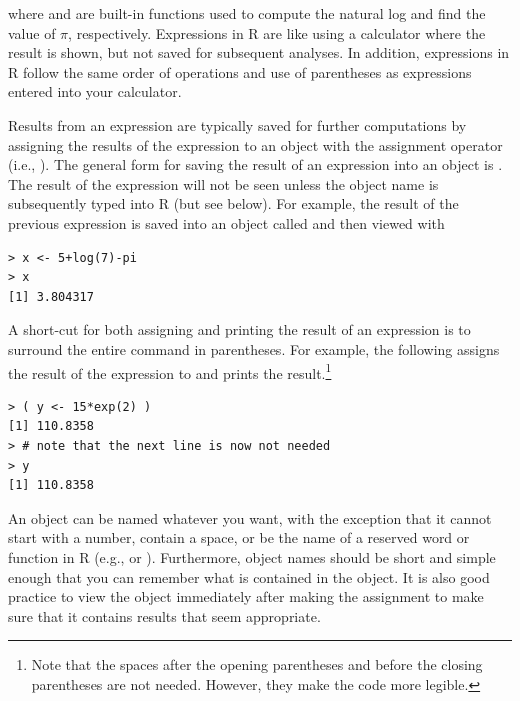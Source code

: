 \documentclass[10pt,openany]{book}\usepackage[]{graphicx}\usepackage[]{color}
\makeatletter
\newenvironment{kframe}{%
 \def\at@end@of@kframe{}%
 \ifinner\ifhmode%
  \def\at@end@of@kframe{\end{minipage}}%
  \begin{minipage}{\columnwidth}%
 \fi\fi%
 \def\FrameCommand##1{\hskip\@totalleftmargin \hskip-\fboxsep
 \colorbox{shadecolor}{##1}\hskip-\fboxsep
     \hskip-\linewidth \hskip-\@totalleftmargin \hskip\columnwidth}%
 \MakeFramed {\advance\hsize-\width
   \@totalleftmargin\z@ \linewidth\hsize
   \@setminipage}}%
 {\par\unskip\endMakeFramed%
 \at@end@of@kframe}
\newenvironment{knitrout}{}{} %
\makeatother
\begin{document}
where  and  are built-in functions used to compute the natural log and find the value of $\pi$, respectively.  Expressions in R are like using a calculator where the result is shown, but not saved for subsequent analyses.  In addition, expressions in R follow the same order of operations and use of parentheses as expressions entered into your calculator.


Results from an expression are typically saved for further computations by assigning the results of the expression to an object with the assignment operator (i.e., \R{<-}).  The general form for saving the result of an expression into an object is .  The result of the expression will not be seen unless the object name is subsequently typed into R (but see below).  For example, the result of the previous expression is saved into an object called  and then viewed with
\begin{knitrout}
\color{fgcolor}\begin{kframe}
\begin{verbatim}
> x <- 5+log(7)-pi
> x
[1] 3.804317
\end{verbatim}
\end{kframe}
\end{knitrout}
A short-cut for both assigning and printing the result of an expression is to surround the entire command in parentheses.  For example, the following assigns the result of the expression to  and prints the result.\footnote{Note that the spaces after the opening parentheses and before the closing parentheses are not needed.  However, they make the code more legible.}
\begin{knitrout}
\color{fgcolor}\begin{kframe}
\begin{verbatim}
> ( y <- 15*exp(2) )
[1] 110.8358
> # note that the next line is now not needed
> y
[1] 110.8358
\end{verbatim}
\end{kframe}
\end{knitrout}


An object can be named whatever you want, with the exception that it cannot start with a number, contain a space, or be the name of a reserved word or function in R (e.g.,  or ).  Furthermore, object names should be short and simple enough that you can remember what is contained in the object.  It is also good practice to view the object immediately after making the assignment to make sure that it contains results that seem appropriate.
\end{document}
